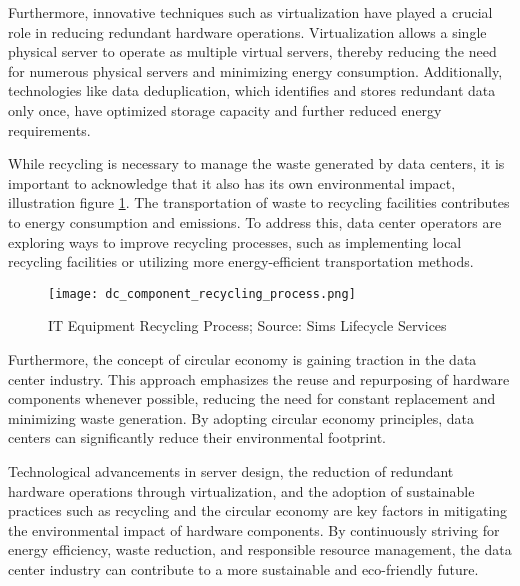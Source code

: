 \documentclass[
  a4paper,  %
  twoside,  %
  bibliography=totoc,
  headsepline,
  cleardoublepage=empty,
  parskip=half,
  draft=false
]{scrbook}
\begin{document}

Furthermore, innovative techniques such as virtualization have played a crucial role in reducing redundant hardware operations\cite{hivenetEWasteCloud}. Virtualization allows a single physical server to operate as multiple virtual servers, thereby reducing the need for numerous physical servers and minimizing energy consumption. Additionally, technologies like data deduplication, which identifies and stores redundant data only once, have optimized storage capacity and further reduced energy requirements.

While recycling is necessary to manage the waste generated by data centers, it is important to acknowledge that it also has its own environmental impact, illustration figure \ref{recycling_lifecycle}. The transportation of waste to recycling facilities contributes to energy consumption and emissions\cite{nor2019energy}. To address this, data center operators are exploring ways to improve recycling processes, such as implementing local recycling facilities or utilizing more energy-efficient transportation methods.

\begin{figure}
	\centering
	\texttt{[image: dc\_component\_recycling\_process.png]}
	\caption{IT Equipment Recycling Process; Source: Sims Lifecycle Services\cite{simslifecycleEquipmentProcessed}}
	\label{recycling_lifecycle}
\end{figure}


Furthermore, the concept of circular economy is gaining traction in the data center industry. This approach emphasizes the reuse and repurposing of hardware components whenever possible, reducing the need for constant replacement and minimizing waste generation. By adopting circular economy principles, data centers can significantly reduce their environmental footprint\cite{datacentremagazineNavigatingAddressing}.

Technological advancements in server design, the reduction of redundant hardware operations through virtualization, and the adoption of sustainable practices such as recycling and the circular economy are key factors in mitigating the environmental impact of hardware components. By continuously striving for energy efficiency, waste reduction, and responsible resource management, the data center industry can contribute to a more sustainable and eco-friendly future.
\end{document}
